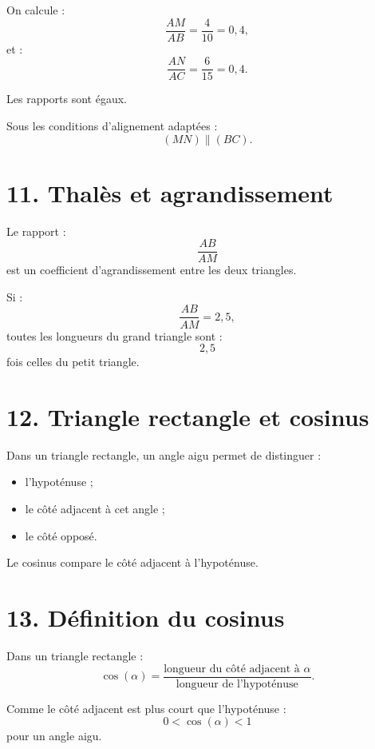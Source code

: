 On calcule :
\[
\dfrac{AM}{AB}=\dfrac4{10}=0{,}4,
\]
et :
\[
\dfrac{AN}{AC}=\dfrac6{15}=0{,}4.
\]

Les rapports sont égaux.

Sous les conditions d'alignement adaptées :
\[
\boxed{(MN)\parallel(BC)}.
\]

\section{11. Thalès et agrandissement}

Le rapport :
\[
\dfrac{AB}{AM}
\]
est un coefficient d'agrandissement entre les deux triangles.

Si :
\[
\dfrac{AB}{AM}=2{,}5,
\]
toutes les longueurs du grand triangle sont :
\[
2{,}5
\]
fois celles du petit triangle.

\section{12. Triangle rectangle et cosinus}

Dans un triangle rectangle, un angle aigu permet de distinguer :
\begin{itemize}
\item l'hypoténuse ;
\item le côté adjacent à cet angle ;
\item le côté opposé.
\end{itemize}

Le cosinus compare le côté adjacent à l'hypoténuse.


\section{13. Définition du cosinus}

\begin{definition}
Dans un triangle rectangle :
\[
\boxed{
\cos(\alpha)
=
\dfrac{\text{longueur du côté adjacent à }\alpha}
{\text{longueur de l'hypoténuse}}
}.
\]
\end{definition}

Comme le côté adjacent est plus court que l'hypoténuse :
\[
0<\cos(\alpha)<1
\]
pour un angle aigu.

